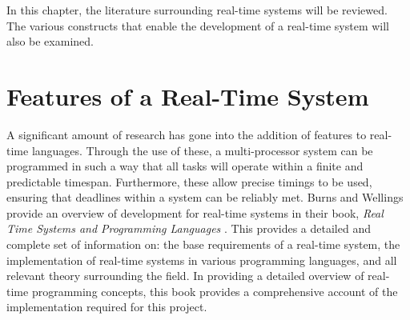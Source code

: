 



In this chapter, the literature surrounding real-time systems will be
reviewed. The various constructs that enable the development of a real-time
system will also be examined.

\section{Features of a Real-Time System}

A significant amount of research has gone into the addition of features to
real-time languages. Through the use of these, a multi-processor system can be
programmed in such a way that all tasks will operate within a finite and 
predictable timespan. Furthermore, these allow precise timings to be
used, ensuring that deadlines within a system can be reliably met.  Burns and
Wellings provide an overview of development for real-time systems in
their book, \emph{Real Time Systems and Programming Languages}
\cite{real-time-systems}.  This provides a detailed and complete set of
information on: 
the base requirements of a real-time system, 
the implementation of real-time systems in various programming languages, 
and all relevant theory surrounding the field. 
In providing a detailed overview of real-time programming concepts, 
this book provides a comprehensive account of the implementation required for
this project.

